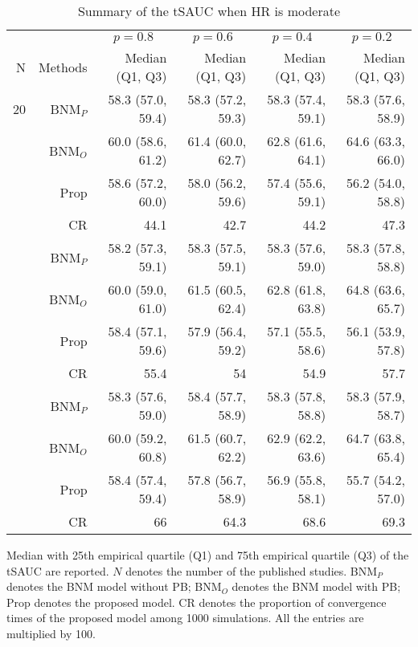 \begin{table}[!htb]

\caption{\label{tab:sauc.med.2}Summary of the tSAUC when HR is moderate}
\centering
\begin{threeparttable}
\begin{tabular}[t]{rrrrrr}
\toprule
\multicolumn{1}{c}{} & \multicolumn{1}{c}{} & \multicolumn{1}{c}{$p = 0.8$} & \multicolumn{1}{c}{$p = 0.6$} & \multicolumn{1}{c}{$p = 0.4$} & \multicolumn{1}{c}{$p = 0.2$} \\
\cmidrule(l{3pt}r{3pt}){3-3} \cmidrule(l{3pt}r{3pt}){4-4} \cmidrule(l{3pt}r{3pt}){5-5} \cmidrule(l{3pt}r{3pt}){6-6}
N & Methods & Median (Q1, Q3) & Median (Q1, Q3) & Median (Q1, Q3) & Median (Q1, Q3)\\
\midrule
20 & BNM$_P$ & 58.3 (57.0, 59.4) & 58.3 (57.2, 59.3) & 58.3 (57.4, 59.1) & 58.3 (57.6, 58.9)\\
 & BNM$_O$ & 60.0 (58.6, 61.2) & 61.4 (60.0, 62.7) & 62.8 (61.6, 64.1) & 64.6 (63.3, 66.0)\\
 & Prop & 58.6 (57.2, 60.0) & 58.0 (56.2, 59.6) & 57.4 (55.6, 59.1) & 56.2 (54.0, 58.8)\\
 & CR & 44.1 & 42.7 & 44.2 & 47.3\\
\addlinespace
30 & BNM$_P$ & 58.2 (57.3, 59.1) & 58.3 (57.5, 59.1) & 58.3 (57.6, 59.0) & 58.3 (57.8, 58.8)\\
 & BNM$_O$ & 60.0 (59.0, 61.0) & 61.5 (60.5, 62.4) & 62.8 (61.8, 63.8) & 64.8 (63.6, 65.7)\\
 & Prop & 58.4 (57.1, 59.6) & 57.9 (56.4, 59.2) & 57.1 (55.5, 58.6) & 56.1 (53.9, 57.8)\\
 & CR & 55.4 & 54 & 54.9 & 57.7\\
\addlinespace
50 & BNM$_P$ & 58.3 (57.6, 59.0) & 58.4 (57.7, 58.9) & 58.3 (57.8, 58.8) & 58.3 (57.9, 58.7)\\
 & BNM$_O$ & 60.0 (59.2, 60.8) & 61.5 (60.7, 62.2) & 62.9 (62.2, 63.6) & 64.7 (63.8, 65.4)\\
 & Prop & 58.4 (57.4, 59.4) & 57.8 (56.7, 58.9) & 56.9 (55.8, 58.1) & 55.7 (54.2, 57.0)\\
 & CR & 66 & 64.3 & 68.6 & 69.3\\
\bottomrule
\end{tabular}
\begin{tablenotes}
\item 
Median with 25th empirical quartile (Q1) and 75th empirical quartile (Q3) of the tSAUC are reported. 
$N$ denotes the number of the published studies. 
BNM$_P$ denotes the BNM model without PB; 
BNM$_O$ denotes the BNM model with PB;
Prop denotes the proposed model.
CR denotes the proportion of convergence times of the proposed model among 1000 simulations.
All the entries are multiplied by 100.
\end{tablenotes}
\end{threeparttable}
\end{table}
